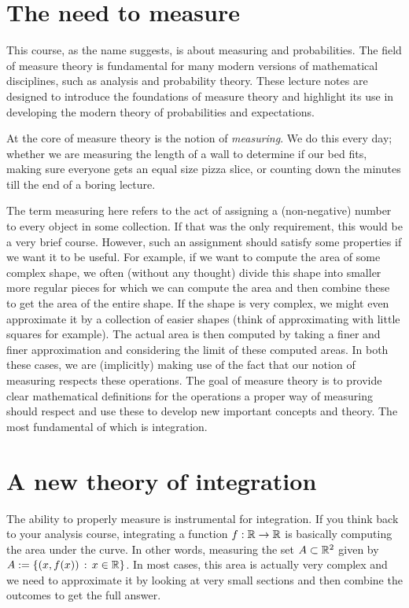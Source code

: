 \section{The need to measure}
This course, as the name suggests, is about measuring and probabilities. The field of measure theory is fundamental for many modern versions of mathematical disciplines, such as analysis and probability theory. These lecture notes are designed to introduce the foundations of measure theory and highlight its use in developing the modern theory of probabilities and expectations.  

At the core of measure theory is the notion of \emph{measuring}. We do this every day; whether we are measuring the length of a wall to determine if our bed fits, making sure everyone gets an equal size pizza slice, or counting down the minutes till the end of a boring lecture. 

The term measuring here refers to the act of assigning a (non-negative) number to every object in some collection. If that was the only requirement, this would be a very brief course. However, such an assignment should satisfy some properties if we want it to be useful. For example, if we want to compute the area of some complex shape, we often (without any thought) divide this shape into smaller more regular pieces for which we can compute the area and then combine these to get the area of the entire shape. If the shape is very complex, we might even approximate it by a collection of easier shapes (think of approximating with little squares for example). The actual area is then computed by taking a finer and finer approximation and considering the limit of these computed areas. In both these cases, we are (implicitly) making use of the fact that our notion of measuring respects these operations. The goal of measure theory is to provide clear mathematical definitions for the operations a proper way of measuring should respect and use these to develop new important concepts and theory. The most fundamental of which is integration. 

\section{A new theory of integration}

The ability to properly measure is instrumental for integration. If you think back to your analysis course, integrating a function $f : \mathbb R \to \mathbb R$ is basically computing the area under the curve. In other words, measuring the set $A \subset \mathbb R^2$ given by $A := \{(x,f(x)) \, :\, x \in \mathbb R\}$. In most cases, this area is actually very complex and we need to approximate it by looking at very small sections and then combine the outcomes to get the full answer.

